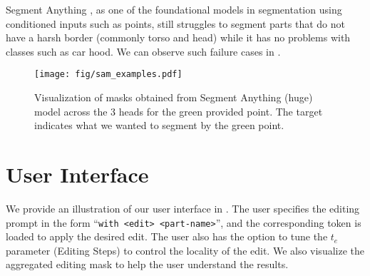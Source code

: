 Segment Anything \citet{kirillov2023segment}, as one of the foundational models in segmentation using conditioned inputs such as points, still struggles to segment parts that do not have a harsh border (commonly torso and head) while it has no problems with classes such as car hood. We can observe such failure cases in . 

\begin{figure*}
    \centering
    \texttt{[image: fig/sam\_examples.pdf]}
    \caption{ Visualization of masks obtained from Segment Anything (huge) model across the 3 heads for the green provided point. The target indicates what we wanted to segment by the green point.}
    \label{fig:sam_examples}
\end{figure*}



\section{User Interface}
We provide an illustration of our user interface in .
The user specifies the editing prompt in the form ``\texttt{with <edit> <part-name>}'', and the corresponding token is loaded to apply the desired edit.
The user also has the option to tune the $t_e$ parameter (Editing Steps) to control the locality of the edit.
We also visualize the aggregated editing mask to help the user understand the results.




